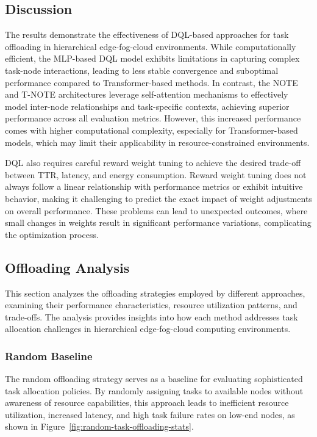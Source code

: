 \documentclass[preprint,3p,authoryear]{elsarticle}
\begin{document}
\subsection{Discussion}

The results demonstrate the effectiveness of DQL-based approaches for task offloading in hierarchical edge-fog-cloud environments. While computationally efficient, the MLP-based DQL model exhibits limitations in capturing complex task-node interactions, leading to less stable convergence and suboptimal performance compared to Transformer-based methods. In contrast, the NOTE and T-NOTE architectures leverage self-attention mechanisms to effectively model inter-node relationships and task-specific contexts, achieving superior performance across all evaluation metrics. However, this increased performance comes with higher computational complexity, especially for Transformer-based models, which may limit their applicability in resource-constrained environments.

DQL also requires careful reward weight tuning to achieve the desired trade-off between TTR, latency, and energy consumption. Reward weight tuning does not always follow a linear relationship with performance metrics or exhibit intuitive behavior, making it challenging to predict the exact impact of weight adjustments on overall performance. These problems can lead to unexpected outcomes, where small changes in weights result in significant performance variations, complicating the optimization process.

\subsection{Offloading Analysis}\label{subsec:offloading-analysis}

This section analyzes the offloading strategies employed by different approaches, examining their performance characteristics, resource utilization patterns, and trade-offs. The analysis provides insights into how each method addresses task allocation challenges in hierarchical edge-fog-cloud computing environments.


\subsubsection{Random Baseline}
\label{subsec:random}

The random offloading strategy serves as a baseline for evaluating sophisticated task allocation policies. By randomly assigning tasks to available nodes without awareness of resource capabilities, this approach leads to inefficient resource utilization, increased latency, and high task failure rates on low-end nodes, as shown in Figure~\ref{fig:random-task-offloading-stats}.
\end{document}

